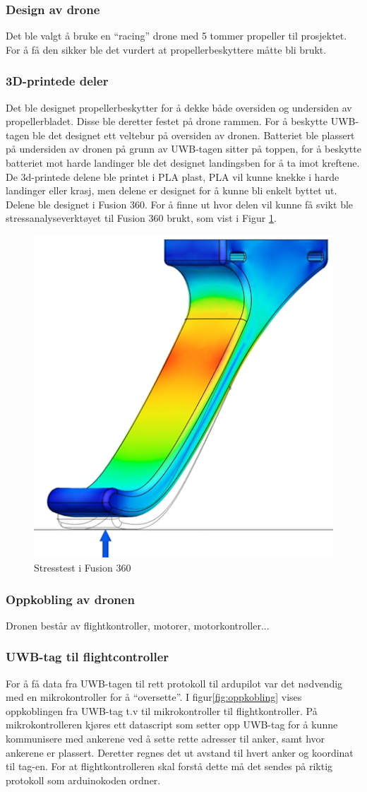 \subsubsection{Design av drone}
Det ble valgt å bruke en “racing” drone med 5 tommer propeller til prosjektet. For å få den sikker ble det vurdert at propellerbeskyttere måtte bli brukt. 

\subsubsection{3D-printede deler}
Det ble designet propellerbeskytter for å dekke både oversiden og undersiden av propellerbladet. Disse ble deretter festet på drone rammen. For å beskytte UWB-tagen ble det designet ett veltebur på oversiden av dronen. 
Batteriet ble plassert på undersiden av dronen på grunn av UWB-tagen sitter på toppen, for å beskytte batteriet mot harde landinger ble det designet landingsben for å ta imot kreftene. 
De 3d-printede delene ble printet i PLA plast, PLA vil kunne knekke i harde landinger eller krasj, men delene er designet for å kunne bli enkelt byttet ut.  Delene ble designet i Fusion 360. For å finne ut hvor delen vil kunne få svikt ble stressanalyseverktøyet til Fusion 360 brukt, som vist i Figur \ref{fig:stresstest}.

\begin{figure}[htp]
\centering
\includegraphics[width=0.4\columnwidth]{figures/stresstest}
\caption{Stresstest i Fusion 360}
\label{fig:stresstest}
\end{figure}

\subsubsection{Oppkobling av dronen}
Dronen består av flightkontroller, motorer, motorkontroller...

\subsubsection{UWB-tag til flightcontroller}
For å få data fra UWB-tagen til rett protokoll til ardupilot var det nødvendig med en mikrokontroller for å “oversette”. I figur\ref{fig:oppkobling} vises oppkoblingen fra UWB-tag t.v til mikrokontroller til flightkontroller. 
På mikrokontrolleren kjøres ett datascript som setter opp UWB-tag for å kunne kommunisere med ankerene ved å sette rette adresser til anker, samt hvor ankerene er plassert. Deretter regnes det ut avstand til hvert anker og koordinat til tag-en. For at flightkontrolleren skal forstå dette må det sendes på riktig protokoll som arduinokoden ordner.   

